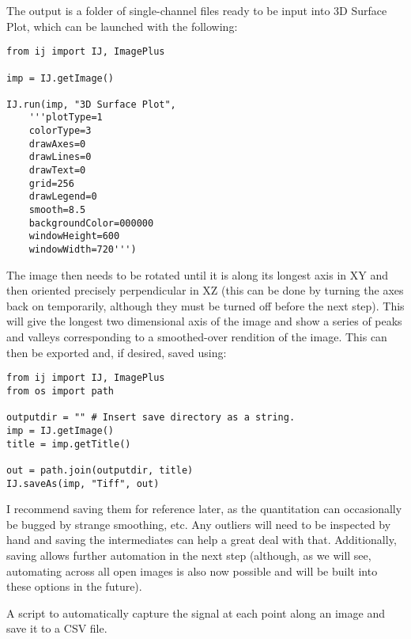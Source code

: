 The output is a folder of single-channel files ready to be input into 3D Surface Plot, which can be launched with the following:

\begin{code}
\begin{verbatim}
from ij import IJ, ImagePlus

imp = IJ.getImage()

IJ.run(imp, "3D Surface Plot", 
    '''plotType=1 
    colorType=3 
    drawAxes=0 
    drawLines=0 
    drawText=0 
    grid=256 
    drawLegend=0 
    smooth=8.5 
    backgroundColor=000000 
    windowHeight=600 
    windowWidth=720''')
\end{verbatim}
\end{code}

The image then needs to be rotated until it is along its longest axis in XY and then oriented precisely perpendicular in XZ (this can be done by turning the axes back on temporarily, although they must be turned off before the next step). This will give the longest two dimensional axis of the image and show a series of peaks and valleys corresponding to a smoothed-over rendition of the image. This can then be exported and, if desired, saved using:

\begin{code}
\begin{verbatim}
from ij import IJ, ImagePlus
from os import path

outputdir = "" # Insert save directory as a string.
imp = IJ.getImage()
title = imp.getTitle()

out = path.join(outputdir, title)
IJ.saveAs(imp, "Tiff", out)
\end{verbatim}
\end{code}

I recommend saving them for reference later, as the quantitation can occasionally be bugged by strange smoothing, etc. Any outliers will need to be inspected by hand and saving the intermediates can help a great deal with that. Additionally, saving allows further automation in the next step (although, as we will see, automating across all open images is also now possible and will be built into these options in the future).

\begin{code}
\caption{A script to automatically capture the signal at each point along an image and save it to a CSV file.}
\label{surfaceplot}

\inputminted[breaklines,frame=single,fontsize=\small]{python}{source/autoSurfacePlotMeasure.py}

\end{code}

